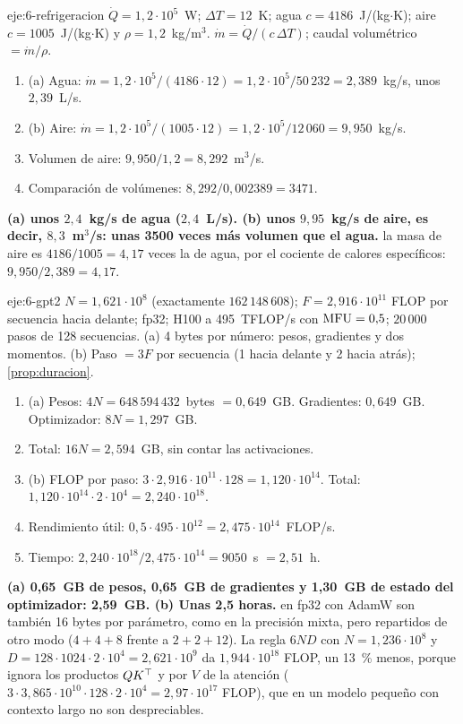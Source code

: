 \begin{solucion}{eje:6-refrigeracion}
\datos $\dot Q=1{,}2\cdot 10^{5}$~W; $\Delta T=12$~K; agua $c=4186$~J/(kg$\cdot$K); aire $c=1005$~J/(kg$\cdot$K) y $\rho=1{,}2$~kg/m$^{3}$.
\planteamiento $\dot m=\dot Q/(c\,\Delta T)$; caudal volumétrico $=\dot m/\rho$.
\pasos
\begin{enumerate}[label=\arabic*.]
  \item (a) Agua: $\dot m=1{,}2\cdot 10^{5}/(4186\cdot 12)=1{,}2\cdot 10^{5}/50\,232=2{,}389$~kg/s, unos $2{,}39$~L/s.
  \item (b) Aire: $\dot m=1{,}2\cdot 10^{5}/(1005\cdot 12)=1{,}2\cdot 10^{5}/12\,060=9{,}950$~kg/s.
  \item Volumen de aire: $9{,}950/1{,}2=8{,}292$~m$^{3}$/s.
  \item Comparación de volúmenes: $8{,}292/0{,}002389=3471$.
\end{enumerate}
\resultado \textbf{(a) unos $2{,}4$~kg/s de agua ($2{,}4$~L/s). (b) unos $9{,}95$~kg/s de aire, es decir, $8{,}3$~m$^{3}$/s: unas 3500 veces más volumen que el agua.}
\comprobacion la masa de aire es $4186/1005=4{,}17$ veces la de agua, por el cociente de calores específicos: $9{,}950/2{,}389=4{,}17$.
\end{solucion}

\begin{solucion}{eje:6-gpt2}
\datos $N=1{,}621\cdot 10^{8}$ (exactamente $162\,148\,608$); $F=2{,}916\cdot 10^{11}$ FLOP por secuencia hacia delante; fp32; H100 a 495~TFLOP/s con $\mathrm{MFU}=0{,}5$; $20\,000$ pasos de 128 secuencias.
\planteamiento (a) 4 bytes por número: pesos, gradientes y dos momentos. (b) Paso $=3F$ por secuencia (1 hacia delante y 2 hacia atrás); \cref{prop:duracion}.
\pasos
\begin{enumerate}[label=\arabic*.]
  \item (a) Pesos: $4N=648\,594\,432$~bytes $=0{,}649$~GB. Gradientes: $0{,}649$~GB. Optimizador: $8N=1{,}297$~GB.
  \item Total: $16N=2{,}594$~GB, sin contar las activaciones.
  \item (b) FLOP por paso: $3\cdot 2{,}916\cdot 10^{11}\cdot 128=1{,}120\cdot 10^{14}$. Total: $1{,}120\cdot 10^{14}\cdot 2\cdot 10^{4}=2{,}240\cdot 10^{18}$.
  \item Rendimiento útil: $0{,}5\cdot 495\cdot 10^{12}=2{,}475\cdot 10^{14}$~FLOP/s.
  \item Tiempo: $2{,}240\cdot 10^{18}/2{,}475\cdot 10^{14}=9050$~s $=2{,}51$~h.
\end{enumerate}
\resultado \textbf{(a) 0{,}65~GB de pesos, 0{,}65~GB de gradientes y 1{,}30~GB de estado del optimizador: 2{,}59~GB. (b) Unas 2{,}5 horas.}
\comprobacion en fp32 con AdamW son también 16 bytes por parámetro, como en la precisión mixta, pero repartidos de otro modo ($4+4+8$ frente a $2+2+12$). La regla $6ND$ con $N=1{,}236\cdot 10^{8}$ y $D=128\cdot 1024\cdot 2\cdot 10^{4}=2{,}621\cdot 10^{9}$ da $1{,}944\cdot 10^{18}$ FLOP, un 13~\% menos, porque ignora los productos $QK^{\top}$ y por $V$ de la atención ($3\cdot 3{,}865\cdot 10^{10}\cdot 128\cdot 2\cdot 10^{4}=2{,}97\cdot 10^{17}$ FLOP), que en un modelo pequeño con contexto largo no son despreciables.
\end{solucion}

